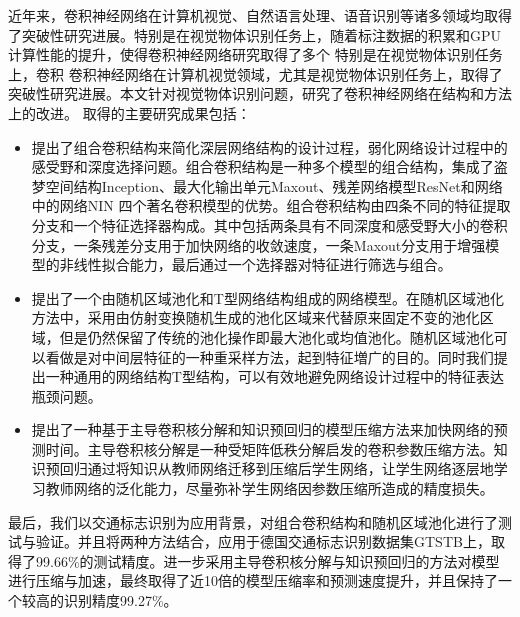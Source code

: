 \begin{cabstract}
  
 近年来，卷积神经网络在计算机视觉、自然语言处理、语音识别等诸多领域均取得了突破性研究进展。特别是在视觉物体识别任务上，随着标注数据的积累和GPU计算性能的提升，使得卷积神经网络研究取得了多个
 特别是在视觉物体识别任务上，卷积
  卷积神经网络在计算机视觉领域，尤其是视觉物体识别任务上，取得了突破性研究进展。本文针对视觉物体识别问题，研究了卷积神经网络在结构和方法上的改进。 取得的主要研究成果包括：
  
  \begin{itemize}
    \item 提出了组合卷积结构来简化深层网络结构的设计过程，弱化网络设计过程中的感受野和深度选择问题。组合卷积结构是一种多个模型的组合结构，集成了盗梦空间结构Inception、最大化输出单元Maxout、残差网络模型ResNet和网络中的网络NIN 四个著名卷积模型的优势。组合卷积结构由四条不同的特征提取分支和一个特征选择器构成。其中包括两条具有不同深度和感受野大小的卷积分支，一条残差分支用于加快网络的收敛速度，一条Maxout分支用于增强模型的非线性拟合能力，最后通过一个选择器对特征进行筛选与组合。
    \item 提出了一个由随机区域池化和T型网络结构组成的网络模型。在随机区域池化方法中，采用由仿射变换随机生成的池化区域来代替原来固定不变的池化区域，但是仍然保留了传统的池化操作即最大池化或均值池化。随机区域池化可以看做是对中间层特征的一种重采样方法，起到特征増广的目的。同时我们提出一种通用的网络结构T型结构，可以有效地避免网络设计过程中的特征表达瓶颈问题。
    \item 提出了一种基于主导卷积核分解和知识预回归的模型压缩方法来加快网络的预测时间。主导卷积核分解是一种受矩阵低秩分解启发的卷积参数压缩方法。知识预回归通过将知识从教师网络迁移到压缩后学生网络，让学生网络逐层地学习教师网络的泛化能力，尽量弥补学生网络因参数压缩所造成的精度损失。
   \end{itemize}

 最后，我们以交通标志识别为应用背景，对组合卷积结构和随机区域池化进行了测试与验证。并且将两种方法结合，应用于德国交通标志识别数据集GTSTB上，取得了99.66\%的测试精度。进一步采用主导卷积核分解与知识预回归的方法对模型进行压缩与加速，最终取得了近10倍的模型压缩率和预测速度提升，并且保持了一个较高的识别精度99.27\%。
 
 \end{cabstract}



